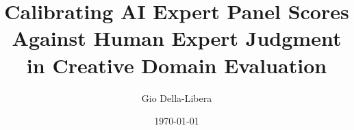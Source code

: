 \documentclass{article}
\title{Calibrating AI Expert Panel Scores Against Human Expert Judgment\\
in Creative Domain Evaluation}
\author{Gio Della-Libera}
\date{\today}
\begin{document}
\maketitle

\begin{abstract}

\end{abstract}










\end{document}
